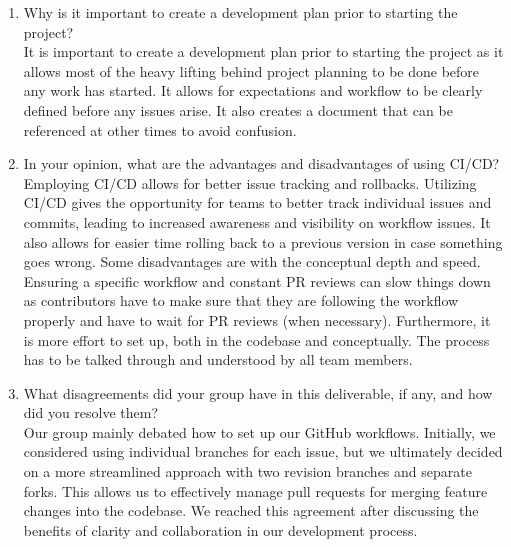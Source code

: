 \begin{enumerate}
\item Why is it important to create a development plan prior to starting the
project?\\

It is important to create a development plan prior to starting the project as
it allows most of the heavy lifting behind project planning to be done before any
work has started. It allows for expectations and workflow to be clearly defined before
any issues arise. It also creates a document that can be referenced at other times 
to avoid confusion.

\item In your opinion, what are the advantages and disadvantages of using
CI/CD?\\

Employing CI/CD allows for better issue tracking and rollbacks. Utilizing CI/CD gives the
opportunity for teams to better track individual issues and commits, leading to increased 
awareness and visibility on workflow issues. It also allows for easier time rolling back
to a previous version in case something goes wrong. 
Some disadvantages are with the conceptual depth and speed. Ensuring a specific workflow 
and constant PR reviews can slow things down as contributors have to make sure that they
are following the workflow properly and have to wait for PR reviews (when necessary). Furthermore,
it is more effort to set up, both in the codebase and conceptually. The process has to be 
talked through and understood by all team members.

\item What disagreements did your group have in this deliverable, if any,
and how did you resolve them?\\

Our group mainly debated how to set up our GitHub workflows. Initially, we considered using individual branches for each issue, but we ultimately decided on a 
more streamlined approach with two revision branches and separate forks. This allows us to effectively manage pull requests for merging feature changes into the codebase. 
We reached this agreement after discussing the benefits of clarity and collaboration in our development process.
\end{enumerate}

